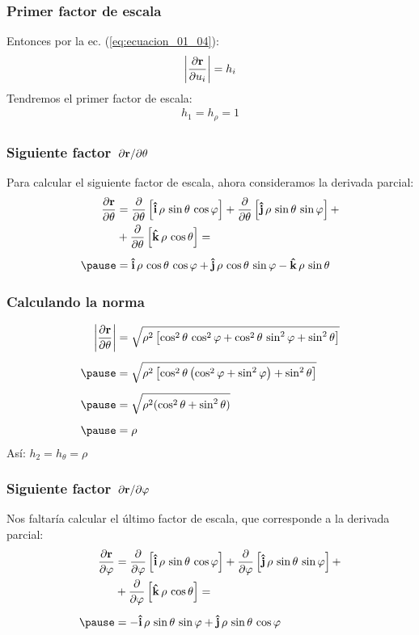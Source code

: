 \documentclass[12pt]{beamer}
\begin{document}
\begin{frame}
\frametitle{Primer factor de escala}
Entonces por la ec. (\ref{eq:ecuacion_01_04}):
\pause
\begin{align*}
\abs{\pdv{\vb{r}}{u_{i}}} = h_{i}
\end{align*}
Tendremos el primer factor de escala:
\pause
\begin{align*}
h_{1} = h_{\rho} = 1
\end{align*}
\end{frame}
\begin{frame}
\frametitle{Siguiente factor $\pdv*{\vb{r}}{\theta}$}
Para calcular el siguiente factor de escala, ahora consideramos la derivada parcial:
\pause
\begin{eqnarray*}
\begin{aligned}
\pdv{\vb{r}}{\theta} &=\pdv{\theta} \left[ \vu{i} \, \rho \, \sin \theta \, \cos \varphi \right] + \pdv{\theta} \left[ \vu{j} \, \rho \, \sin \theta \, \sin \varphi \right] + \\
&+ \pdv{\theta} \left[ \vu{k} \, \rho \, \cos \theta \right] = \\[0.5em] \pause
&= \vu{i} \, \rho \, \cos \theta \, \cos \varphi + \vu{j} \, \rho \, \cos \theta \, \sin \varphi - \vu{k} \, \rho \, \sin \theta
\end{aligned}
\end{eqnarray*}
\end{frame}
\begin{frame}
\frametitle{Calculando la norma}
\begin{eqnarray*}
\begin{aligned}
\abs{\pdv{\vb{r}}{\theta}} &= \sqrt{\rho^{2} \left[ \cos^{2} \theta \, \cos^{2} \varphi + \cos^{2} \theta \, \sin^{2} \varphi + \sin^{2} \theta \right]} \\[0.5em] \pause
&= \sqrt{\rho^{2} \left[ \cos^{2} \theta \left(\cos^{2} \varphi + \sin^{2} \varphi \right) + \sin^{2} \theta \right]} \\[0.5em] \pause
&= \sqrt{\rho^{2} (\cos^{2} \theta + \sin^{2} \theta)} \\[0.5em] \pause
&= \rho
\end{aligned}
\end{eqnarray*}
\pause
Así: $h_{2} = h_{\theta} = \rho$
\end{frame}
\begin{frame}
\frametitle{Siguiente factor $\pdv*{\vb{r}}{\varphi}$}
Nos faltaría calcular el último factor de escala, que corresponde a la derivada parcial:
\pause
\begin{eqnarray*}
\begin{aligned}
\pdv{\vb{r}}{\varphi} &= \pdv{\varphi} \left[ \vu{i} \, \rho \, \sin \theta \, \cos \varphi \right] + \pdv{\varphi} \left[ \vu{j} \, \rho \, \sin \theta \, \sin \varphi \right] + \\
&+ \pdv{\varphi} \left[ \vu{k} \, \rho \, \cos \theta \right] = \\[0.5em] \pause
&= - \vu{i} \, \rho \, \sin \theta \, \sin \varphi + \vu{j} \, \rho \, \sin \theta \, \cos \varphi
\end{aligned}
\end{eqnarray*}
\end{frame}
\end{document}
